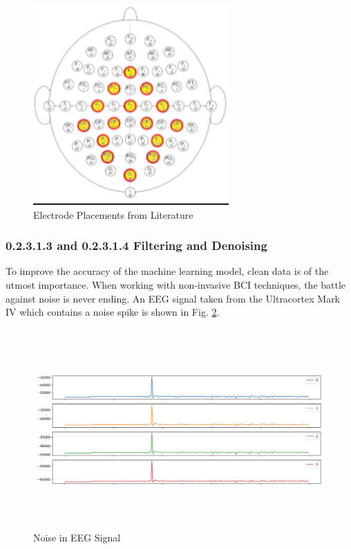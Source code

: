 \documentclass[conference]{IEEEtran}
\begin{document}
        \begin{figure}[htbp]
            \centering
            \includegraphics[keepaspectratio, height=3in]{figs/paper/good_placements.png}
            \caption{Electrode Placements from Literature}
            \label{fig:good_placements}
        \end{figure}

        \subsubsection{0.2.3.1.3 and 0.2.3.1.4 Filtering and Denoising}
        To improve the accuracy of the machine learning model, clean data is of the utmost importance. When working with non-invasive BCI techniques, the battle against noise is never ending. An EEG signal taken from the Ultracortex Mark IV which contains a noise spike is shown in Fig. \ref{fig:noisy_eeg}. 

        \begin{figure}[htbp]
            \centering
            \includegraphics[keepaspectratio, height=3in, angle=90]{figs/paper/noisy_signal.png}
            \caption{Noise in EEG Signal}
            \label{fig:noisy_eeg}
        \end{figure}
        
\end{document}

